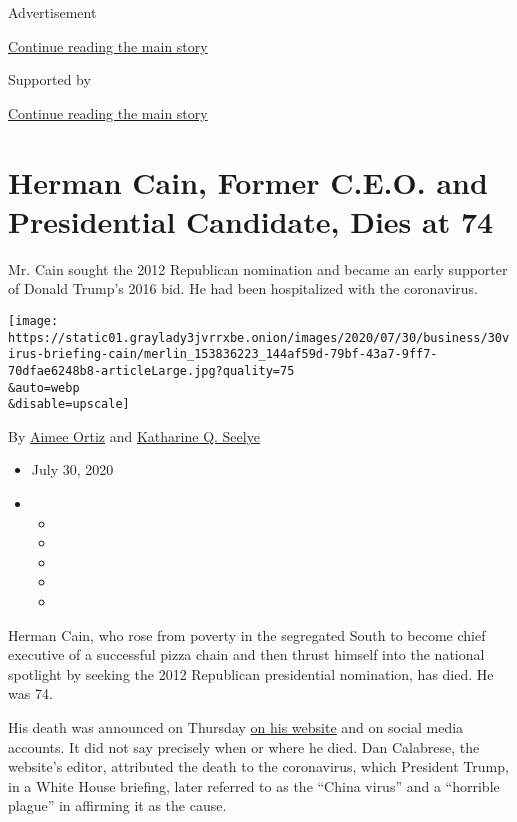 Advertisement

\protect\hyperlink{after-top}{Continue reading the main story}

Supported by

\protect\hyperlink{after-sponsor}{Continue reading the main story}

\hypertarget{herman-cain-former-ceo-and-presidential-candidate-dies-at-74}{%
\section{Herman Cain, Former C.E.O. and Presidential Candidate, Dies at
74}\label{herman-cain-former-ceo-and-presidential-candidate-dies-at-74}}

Mr. Cain sought the 2012 Republican nomination and became an early
supporter of Donald Trump's 2016 bid. He had been hospitalized with the
coronavirus.

\texttt{[image: https://static01.graylady3jvrrxbe.onion/images/2020/07/30/business/30virus-briefing-cain/merlin\_153836223\_144af59d-79bf-43a7-9ff7-70dfae6248b8-articleLarge.jpg?quality=75\\\&auto=webp\\\&disable=upscale]}

By \href{https://www.nytimes3xbfgragh.onion/by/aimee-ortiz}{Aimee Ortiz}
and
\href{https://www.nytimes3xbfgragh.onion/by/katharine-q-seelye}{Katharine
Q. Seelye}

\begin{itemize}
\item
  July 30, 2020
\item
  \begin{itemize}
  \item
  \item
  \item
  \item
  \item
  \end{itemize}
\end{itemize}

Herman Cain, who rose from poverty in the segregated South to become
chief executive of a successful pizza chain and then thrust himself into
the national spotlight by seeking the 2012 Republican presidential
nomination, has died. He was 74.

His death was announced on Thursday
\href{https://hermancain.com/heartbroken-world-poorer-herman-cain-gone-lord/?utm_source=twitter\&utm_medium=thenewvoice\&utm_content=2020-07-30}{on
his website} and on social media accounts. It did not say precisely when
or where he died. Dan Calabrese, the website's editor, attributed the
death to the coronavirus, which President Trump, in a White House
briefing, later referred to as the ``China virus'' and a ``horrible
plague'' in affirming it as the cause.

